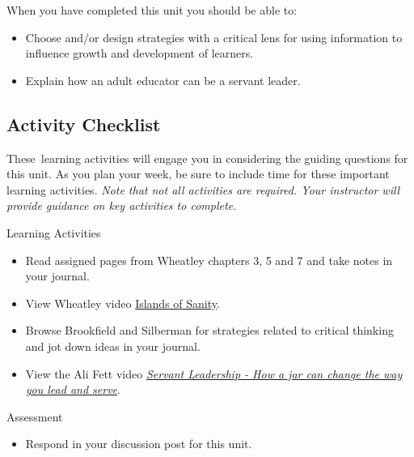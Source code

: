 \documentclass[
]{book}
\providecommand{\tightlist}{%
  \setlength{\itemsep}{0pt}\setlength{\parskip}{0pt}}
\begin{document}
When you have completed this unit you should be able to:

\begin{itemize}
\tightlist
\item
  Choose and/or design strategies with a critical lens for using information to influence growth and development of learners.\\
\item
  Explain how an adult educator can be a servant leader.
\end{itemize}

\hypertarget{activity-checklist-6}{%
\subsection*{Activity Checklist}\label{activity-checklist-6}}

These~learning activities will engage you in considering the guiding questions for this unit. As you plan your week, be sure to include time for these important learning activities. \emph{Note that not all activities are required. Your instructor will provide guidance on key activities to complete.}

\begin{reflect}
{Learning Activities}

\begin{itemize}
\tightlist
\item
  Read assigned pages from Wheatley chapters 3, 5 and 7 and take notes
  in your journal.\\
\item
  View Wheatley video \href{https://youtu.be/LtaYNxp56gs}{Islands of
  Sanity}.\\
\item
  Browse Brookfield and Silberman for strategies related to critical
  thinking and jot down ideas in your journal.\\
\item
  View the Ali Fett video
  \href{https://youtu.be/1vIPrR_clEg}{\emph{Servant Leadership - How a
  jar can change the way you lead and serve}}.
\end{itemize}
\end{reflect}

\begin{assessment}
{Assessment}

\begin{itemize}
\tightlist
\item
  Respond in your discussion post for this unit.
\end{itemize}
\end{assessment}
\end{document}
